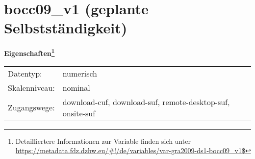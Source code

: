 
    \setcounter{footnote}{0}

    \vspace*{-1.8cm}
	\section{bocc09\_v1 (geplante Selbstständigkeit)}
	\label{section:bocc09_v1}



    \vspace*{0.5cm}
    \noindent\textbf{Eigenschaften\footnote{Detailliertere Informationen zur Variable finden sich unter
		\url{https://metadata.fdz.dzhw.eu/\#!/de/variables/var-gra2009-ds1-bocc09_v1$}}}\\
	\begin{tabularx}{\hsize}{@{}lX}
	Datentyp: & numerisch \\
	Skalenniveau: & nominal \\
	Zugangswege: &
	  download-cuf, 
	  download-suf, 
	  remote-desktop-suf, 
	  onsite-suf
 \\
    \end{tabularx}



